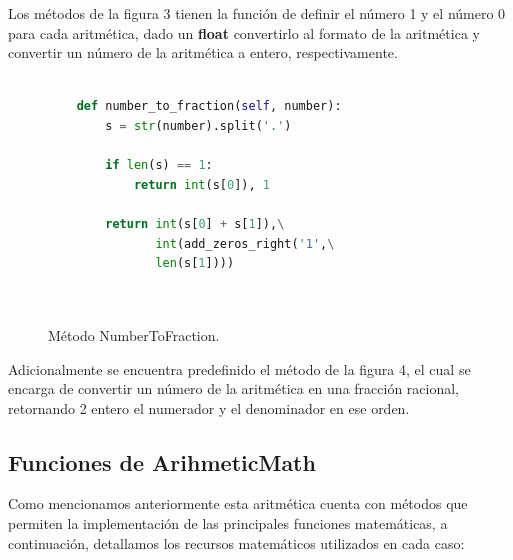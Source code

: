 \documentclass[a4paper,10pt,twocolumn]{article}
\begin{document}
	Los métodos de la figura 3 tienen la función de definir el número 1 y el número 0 para cada aritmética, dado un \textbf{float} convertirlo al formato de la aritmética y  convertir un número de la aritmética a entero, respectivamente.
	
	\begin{figure}[htb]%
			\begin{lstlisting}[language=python]%

    def number_to_fraction(self, number):
        s = str(number).split('.')

        if len(s) == 1:
            return int(s[0]), 1

        return int(s[0] + s[1]),\
               int(add_zeros_right('1',\
               len(s[1])))

		
		\end{lstlisting}
		\caption{Método NumberToFraction.\label{fig:code}}
		\end{figure}
		
	Adicionalmente se encuentra predefinido el método de la figura 4, el cual se encarga de convertir un número de la aritmética en una fracción racional, retornando 2 entero el numerador y el denominador en ese orden.
	
\subsection{Funciones de ArihmeticMath}\label{sub:functions}

	
	Como mencionamos anteriormente esta aritmética cuenta con métodos que permiten la implementación de las principales funciones matemáticas, a continuación, detallamos los recursos matemáticos utilizados en cada caso:
	
\end{document}
